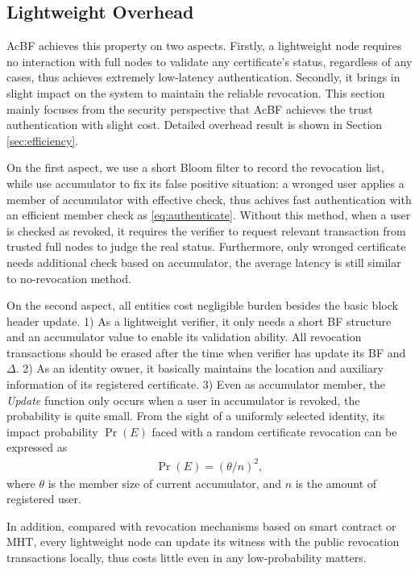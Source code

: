 \documentclass[conference]{IEEEtran}
\begin{document}
\subsection{Lightweight Overhead}
AcBF achieves this property on two aspects. Firstly, a lightweight node requires no interaction with full nodes to validate any certificate's status, regardless of any cases, thus achieves extremely low-latency authentication. Secondly, it brings in slight impact on the system to maintain the reliable revocation. This section mainly focuses from the security perspective that AcBF achieves the trust authentication with slight cost. Detailed overhead result is shown in Section \ref{sec:efficiency}.

On the first aspect, we use a short Bloom filter to record the revocation list, while use accumulator to fix its false positive situation: a wronged user applies a member of accumulator with effective check, thus achives fast authentication with an efficient member check as \eqref{eq:authenticate}. Without this method, when a user is checked as revoked, it requires the verifier to request relevant transaction from trusted full nodes to judge the real status. Furthermore, only wronged certificate needs additional check based on accumulator, the average latency is still similar to no-revocation method. 

On the second aspect, all entities cost negligible burden besides the basic block header update. 1) As a lightweight verifier, it only needs a short BF structure and an accumulator value to enable its validation ability. All revocation transactions should be erased after the  time when verifier has update its BF and $\Delta$. 2) As an identity owner, it basically maintains the location and auxiliary information of its registered certificate. 3) Even as accumulator member, the \textit{Update} function only occurs when a user in accumulator is revoked, the probability is quite small. From the sight of a uniformly selected identity, its impact probability $\Pr(E)$ faced with a random certificate revocation can be expressed as 
\begin{align}
	\Pr(E) = (\theta / n)^2 ,
\end{align}
where $\theta$ is the member size of current accumulator, and $n$ is the amount of registered user.

In addition, compared with revocation mechanisms based on smart contract or MHT, every lightweight node can update its witness with the public revocation transactions locally, thus costs little even in any low-probability matters.
\end{document}
